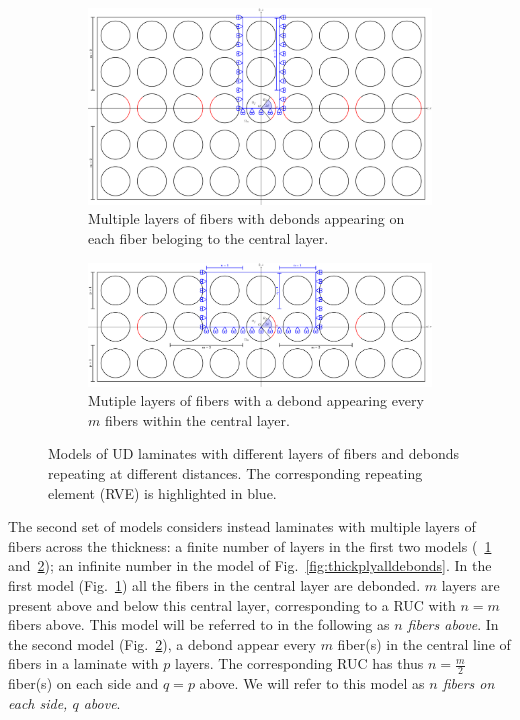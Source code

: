 \documentclass[review]{elsarticle}
\begin{document}
\begin{figure}[!h]
\centering
    \begin{subfigure}[b]{\textwidth}
    \centering
        \includegraphics[height=0.3\textheight]{thickPlycentraldebondsline.pdf}
        \caption{Multiple layers of fibers with debonds appearing on each fiber beloging to the central layer.}\label{subfig:thickplycentraldebonds}
    \end{subfigure} 

    \begin{subfigure}[b]{\textwidth}
        \includegraphics[width=\textwidth]{thickPly.pdf}
        \caption{Mutiple layers of fibers with a debond appearing every $m$ fibers within the central layer.}\label{subfig:thickply}
    \end{subfigure} 

\caption{Models of UD laminates with different layers of fibers and debonds repeating at different distances. The corresponding repeating element (RVE) is highlighted in blue.}\label{fig:laminateModelsB}
\end{figure}

The second set of models considers instead laminates with multiple layers of fibers across the thickness: a finite number of layers in the first two models (~\ref{subfig:thickplycentraldebonds} and~\ref{subfig:thickply}); an infinite number in the model of Fig.~\ref{fig:thickplyalldebonds}. In the first model (Fig.~\ref{subfig:thickplycentraldebonds}) all the fibers in the central layer are debonded. $m$ layers are present above and below this central layer, corresponding to a RUC with $n=m$ fibers above. This model will be referred to in the following as \textit{$n$ fibers above}. In the second model (Fig.~\ref{subfig:thickply}), a debond appear every $m$ fiber(s) in the central line of fibers in a laminate with $p$ layers. The corresponding RUC has thus $n=\frac{m}{2}$ fiber(s) on each side and $q=p$ above. We will refer to this model as \textit{$n$ fibers on each side, $q$ above}.
\end{document}
